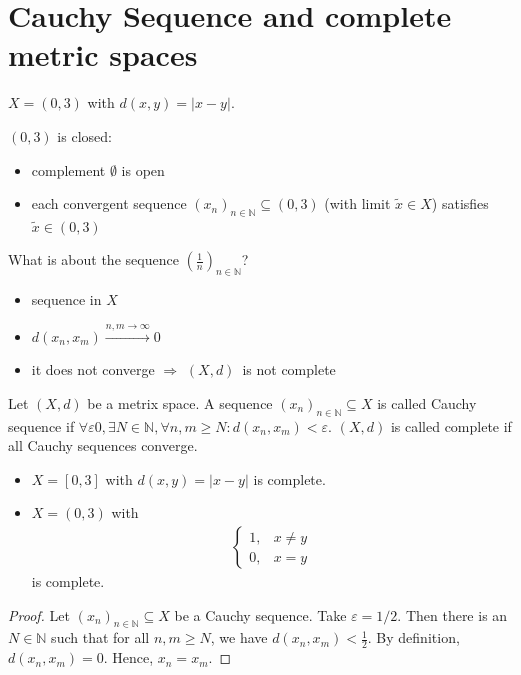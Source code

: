 \documentclass[../../note.tex]{subfiles}
\begin{document}
\section{Cauchy Sequence and complete metric spaces}
\begin{example}
    $X = (0,3)$ with $d(x,y) = \vert x-y \vert$.

    $(0,3)$ is closed:
    \begin{itemize}
        \item complement $\emptyset$ is open
        \item each convergent sequence $(x_n)_{n \in \mathbb{N}} \subseteq (0,3)$ (with limit $\tilde{x} \in X$) satisfies $\tilde{x} \in (0,3)$
    \end{itemize}

    What is about the sequence $(\frac{1}{n})_{n \in \mathbb{N}}$?
    \begin{itemize}
        \item sequence in $X$
        \item $d(x_n, x_m) \stackrel{n, m \rightarrow \infty}{\longrightarrow} 0$ 
        \item it does not converge 
        $\Longrightarrow$ $(X,d)$~\textrm{is not complete} 
    \end{itemize}
\end{example}

\begin{definition}
    Let $(X,d)$ be a metrix space. A sequence $(x_n)_{n \in \mathbb{N}} \subseteq X$ is called Cauchy sequence if $\forall \varepsilon 0, \exists N \in \mathbb{N}, \forall n,m \geq N: d(x_n, x_m)<\varepsilon$. $(X,d)$ is called complete if all Cauchy sequences converge.
\end{definition}

\begin{example}
    \begin{itemize}
        \item $X = [0,3]$ with $d(x,y) = \vert x - y \vert$ is complete.
        \item $X = (0,3)$ with 
        \begin{align}
            \left\{\begin{matrix}
                1,& x\neq y \\
                0,& x= y
            \end{matrix}
            \right.
        \end{align}
        is complete.
    \end{itemize}
    \begin{proof}
        Let $(x_n)_{n \in \mathbb{N}} \subseteq X$ be a Cauchy sequence. Take $\varepsilon =1/2$. Then there is an $N \in \mathbb{N}$ such that for all $n,m \geq N$, we have $d(x_n, x_m) <\frac{1}{2}$. By definition,  $d(x_n, x_m) = 0$. Hence, $x_n = x_m$.
    \end{proof}
\end{example}
\end{document}
